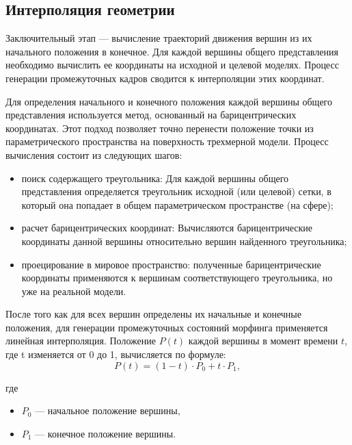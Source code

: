     \subsection{Интерполяция геометрии}
    Заключительный этап --- вычисление траекторий движения вершин из их начального положения в конечное. Для каждой вершины общего представления необходимо вычислить ее координаты на исходной и целевой моделях. Процесс генерации промежуточных кадров сводится к интерполяции этих координат.

    Для определения начального и конечного положения каждой вершины общего представления используется метод, основанный на барицентрических координатах. Этот подход позволяет точно перенести положение точки из параметрического пространства на поверхность трехмерной модели.
    Процесс вычисления состоит из следующих шагов:
    \begin{itemize}
        \item поиск содержащего треугольника: Для каждой вершины общего представления определяется треугольник исходной (или целевой) сетки, в который она попадает в общем параметрическом пространстве (на сфере);
        \item расчет барицентрических координат: Вычисляются барицентрические координаты данной вершины относительно вершин найденного треугольника;
        \item проецирование в мировое пространство: полученные барицентрические координаты применяются к вершинам соответствующего треугольника, но уже на реальной модели.
    \end{itemize}

    После того как для всех вершин определены их начальные и конечные положения, для генерации промежуточных состояний морфинга применяется линейная интерполяция. Положение $P(t)$ каждой вершины в момент времени $t$, где t изменяется от 0 до 1, вычисляется по формуле:
    \begin{equation}
        P(t) = (1 - t) \cdot P_0 + t \cdot P_1,
    \end{equation}

    где
    \begin{itemize}
        \item $P_0$ --- начальное положение вершины,
        \item $P_1$ --- конечное положение вершины.
    \end{itemize}
    
